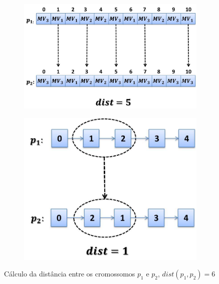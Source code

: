 
\begin{figure}[H]
\centering
\begin{subfigure}{.5\textwidth}
  \centering
  \includegraphics[width=.9\linewidth]{figure/distance1.jpg}
 \end{subfigure}%
\begin{subfigure}{.4\textwidth}
  \centering
  \includegraphics[width=.9\linewidth]{figure/distance2.jpg}
\end{subfigure}
\caption{Cálculo da distância entre os cromossomos $p_1$ e $p_2$, $dist(p_1, p_2) = 6$}
\label{fig:distance}
\end{figure}

